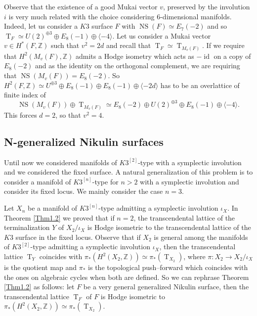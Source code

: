 \documentclass{amsart}
\theoremstyle{definition}
\numberwithin{equation}{section}
\numberwithin{equation}{section} \theoremstyle{definition}
\DeclareMathOperator{\NS}{NS}
\DeclareMathOperator{\T}{T}
\DeclareMathOperator{\id}{id}
\newcommand{\ra}{\rightarrow}
\newcommand\Z{\mathbb{Z}}
\begin{document}
Observe that the existence of a good Mukai vector $v$, preserved by the involution $i$ is very much related with the choice considering $6$-dimensional manifolds. Indeed, let us consider a $K3$ surface $F$ with $\NS(F)\simeq E_7(-2)$ and so $\T_F\simeq U(2)^{\oplus 3}\oplus E_8(-1)\oplus \langle -4\rangle$. Let us consider a Mukai vector $v\in H^*(F,\Z)$ such that $v^2=2d$ and recall that $\T_F\simeq \T_{M_v(F)}$. If we require that $H^2(M_v(F),\Z)$ admits a Hodge isometry which acts as $-\id$ on a copy of $E_8(-2)$ and as the identity on the orthogonal complement, we are requiring that $\NS(M_v(F))=E_8(-2)$. So $H^2(F,\Z)\simeq U^{\oplus 3}\oplus E_8(-1)\oplus E_8(-1)\oplus \langle -2d\rangle$ has to be an overlattice of finite index of $$\NS(M_v(F))\oplus \T_{M_v(F)}\simeq E_8(-2)\oplus U(2)^{\oplus 3}\oplus E_8(-1)\oplus \langle -4\rangle.$$ This forces $d=2$, so that $v^2=4$.


\subsection{N-generalized Nikulin surfaces}\label{subset: N generalized}
Until now we considered manifolds of $K3^{[2]}$-type with a symplectic involution and we considered the fixed surface. A natural generalization of this problem is to consider a manifold of  $K3^{[n]}$-type for $n>2$ with a symplectic involution and consider its fixed locus. We mainly consider the case $n=3$.

Let $X_n$ be a  manifold of $K3^{[n]}$-type admitting a symplectic involution $\iota_X$. In Theorem \ref{Thm1.2} we proved that if $n=2$, the transcendental lattice of the terminalization $Y$ of $X_2/\iota_X$ is Hodge isometric to the transcendental lattice of the $K3$ surface in the fixed locus.  Observe that if $X_2$ is general among the manifolds of $K3^{[2]}$-type admitting a symplectic involution $\iota_X$, then the transcendental lattice $\T_Y$ coincides with $\pi_*(H^2(X_2,\Z))\simeq \pi_*(\T_{X_2})$, where $\pi:X_2\ra X_2/\iota_X$ is the quotient map and $\pi_*$ is the topological push--forward which coincides with the ones on algebraic cycles when both are defined. So we can rephrase Theorem \ref{Thm1.2} as follows: let $F$ be a very general generalized Nikulin surface, then the transcendental lattice $\T_F$ of $F$ is Hodge isometric to $\pi_*(H^2(X_2,\Z))\simeq \pi_*(\T_{X_2})$.\\
\end{document}
